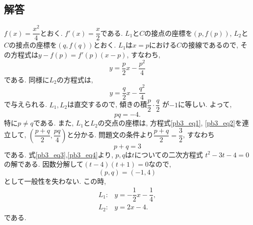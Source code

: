 \documentclass[dvipdfmx,a4paper]{jsarticle}
\newcommand{\2}{I\hspace{-1pt}I}
\newcommand{\3}{I\hspace{-1pt}I\hspace{-1pt}I}
\begin{document}
    \subsection{解答}
    $f(x) = \dfrac{x^2}{4}$とおく. $f'(x) = \dfrac{x}{2}$である. 
    $L_1$と$C$の接点の座標を$(p, f(p))$, $L_2$と$C$の接点の座標を$(q, f(q))$とおく. 
    $L_1$は$x=p$における$C$の接線であるので, その方程式は$y-f(p) = f'(p)(x-p)$, すなわち, 
    \begin{equation} \label{pb3_eq1}
        y = \dfrac{p}{2} x - \dfrac{p^2}{4}
    \end{equation}
    である. 同様に$L_2$の方程式は, 
    \begin{equation} \label{pb3_eq2}
        y = \dfrac{q}{2} x - \dfrac{q^2}{4}
    \end{equation}
    で与えられる. $L_1, L_2$は直交するので, 傾きの積$\dfrac{p}{2} \cdot \dfrac{q}{2}$
    が$-1$に等しい. よって, 
    \begin{equation} \label{pb3_eq3}
        pq = -4.
    \end{equation}
    特に$p \neq q$である. 
    また, $L_1$と$L_2$の交点の座標は, 方程式\eqref{pb3_eq1}, \eqref{pb3_eq2}を連立して, 
    $\left(\dfrac{p+q}{2}, \dfrac{pq}{4}\right)$と分かる. 
    問題文の条件より$\dfrac{p+q}{2} = \dfrac{3}{2}$, すなわち
    \begin{equation} \label{pb3_eq4}
        p + q = 3
    \end{equation}
    である. 式\eqref{pb3_eq3},\eqref{pb3_eq4}より, $p,q$は$t$についての二次方程式
    $t^2 -3t -4 = 0$の解である. 因数分解して$(t-4)(t+1)=0$なので, 
    \begin{equation*}
        (p,q) = (-1, 4)
    \end{equation*}
    として一般性を失わない. この時, 
    \begin{align*}
        L_1 :& y =  -\dfrac{1}{2} x - \dfrac{1}{4}, \\
        L_2 :& y =  2 x - 4.
    \end{align*}
    である. 
\end{document}
